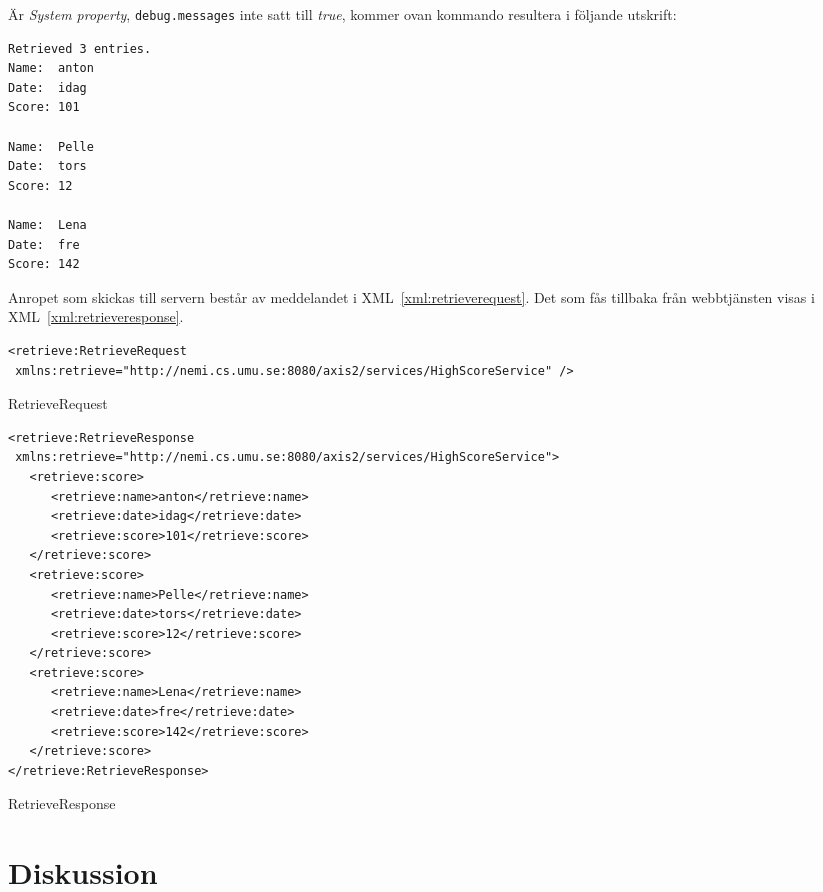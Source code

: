 \documentclass[a4paper, 12pt]{article}
\begin{document}
Är \textit{System property}, \verb!debug.messages! inte satt till
\textit{true}, kommer ovan kommando resultera i följande utskrift:

\begin{footnotesize}
\begin{verbatim}
Retrieved 3 entries.
Name:  anton
Date:  idag
Score: 101

Name:  Pelle
Date:  tors
Score: 12

Name:  Lena
Date:  fre
Score: 142
\end{verbatim}
\end{footnotesize}

Anropet som skickas till servern består av meddelandet i
XML~\ref{xml:retrieverequest}. Det som fås tillbaka från webbtjänsten
visas i XML~\ref{xml:retrieveresponse}.

\begin{xml}
  \begin{footnotesize}
\begin{verbatim}
<retrieve:RetrieveRequest
 xmlns:retrieve="http://nemi.cs.umu.se:8080/axis2/services/HighScoreService" />
\end{verbatim}
  \end{footnotesize}
  \caption{RetrieveRequest}\label{xml:retrieverequest}
\end{xml}

\begin{xml}
  \begin{footnotesize}
\begin{verbatim}
<retrieve:RetrieveResponse
 xmlns:retrieve="http://nemi.cs.umu.se:8080/axis2/services/HighScoreService">
   <retrieve:score>
      <retrieve:name>anton</retrieve:name>
      <retrieve:date>idag</retrieve:date>
      <retrieve:score>101</retrieve:score>
   </retrieve:score>
   <retrieve:score>
      <retrieve:name>Pelle</retrieve:name>
      <retrieve:date>tors</retrieve:date>
      <retrieve:score>12</retrieve:score>
   </retrieve:score>
   <retrieve:score>
      <retrieve:name>Lena</retrieve:name>
      <retrieve:date>fre</retrieve:date>
      <retrieve:score>142</retrieve:score>
   </retrieve:score>
</retrieve:RetrieveResponse>
\end{verbatim}
  \end{footnotesize}
  \caption{RetrieveResponse}\label{xml:retrieveresponse}
\end{xml}

\section{Diskussion}\label{Diskussion}
\end{document}
